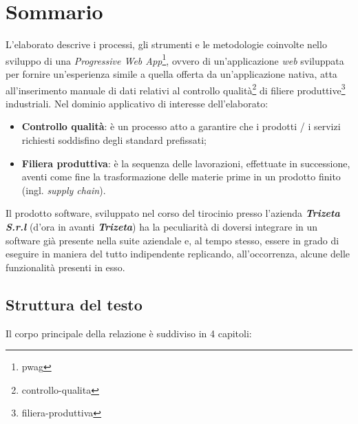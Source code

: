 \cleardoublepage
{}
{}
\begingroup
\let\clearpage\relax
\let\cleardoublepage\relax
\let\cleardoublepage\relax

\chapter*{Sommario}
L'elaborato descrive i processi, gli strumenti e le metodologie coinvolte nello sviluppo di una \textit{Progressive Web App}\footnote{\gls{pwag}}, ovvero di un'applicazione \textit{web} sviluppata per fornire un'esperienza simile a quella offerta da un'applicazione nativa, 
atta all'inserimento manuale di dati relativi al controllo qualità\footnote{\gls{controllo-qualita}} di 
filiere produttive\footnote{\gls{filiera-produttiva}} industriali. 
\newline
Nel dominio applicativo di interesse dell'elaborato:
\begin{itemize}
    \item \textbf{Controllo qualità}: è un processo atto a garantire che i prodotti / i servizi richiesti soddisfino degli standard prefissati;
    \item \textbf{Filiera produttiva}: è la sequenza delle lavorazioni, effettuate in successione, aventi come fine la trasformazione delle materie prime in un prodotto finito (ingl. \textit{supply chain}).
\end{itemize} 
Il prodotto software, sviluppato nel corso del tirocinio presso l'azienda \textit{\textbf{Trizeta S.r.l}} (d'ora in avanti \textit{\textbf{Trizeta}}) ha la peculiarità di doversi integrare in un software già presente nella suite aziendale e, al tempo stesso, essere in grado di eseguire in maniera del tutto indipendente replicando, all'occorrenza, alcune delle funzionalità presenti in esso.

\section*{Struttura del testo}

Il corpo principale della relazione è suddiviso in 4 capitoli:

